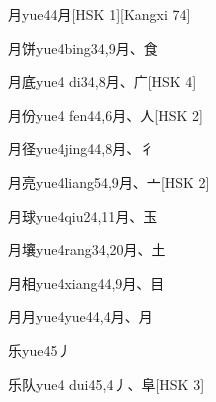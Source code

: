\begin{entry}{月}{yue4}{4}{⽉}[HSK 1][Kangxi 74]
\end{entry}

\begin{entry}{月饼}{yue4bing3}{4,9}{⽉、⾷}
\end{entry}

\begin{entry}{月底}{yue4 di3}{4,8}{⽉、⼴}[HSK 4]
\end{entry}

\begin{entry}{月份}{yue4 fen4}{4,6}{⽉、⼈}[HSK 2]
\end{entry}

\begin{entry}{月径}{yue4jing4}{4,8}{⽉、⼻}
\end{entry}

\begin{entry}{月亮}{yue4liang5}{4,9}{⽉、⼇}[HSK 2]
\end{entry}

\begin{entry}{月球}{yue4qiu2}{4,11}{⽉、⽟}
\end{entry}

\begin{entry}{月壤}{yue4rang3}{4,20}{⽉、⼟}
\end{entry}

\begin{entry}{月相}{yue4xiang4}{4,9}{⽉、⽬}
\end{entry}

\begin{entry}{月月}{yue4yue4}{4,4}{⽉、⽉}
\end{entry}

\begin{entry}{乐}{yue4}{5}{⼃}
\end{entry}

\begin{entry}{乐队}{yue4 dui4}{5,4}{⼃、⾩}[HSK 3]
\end{entry}

